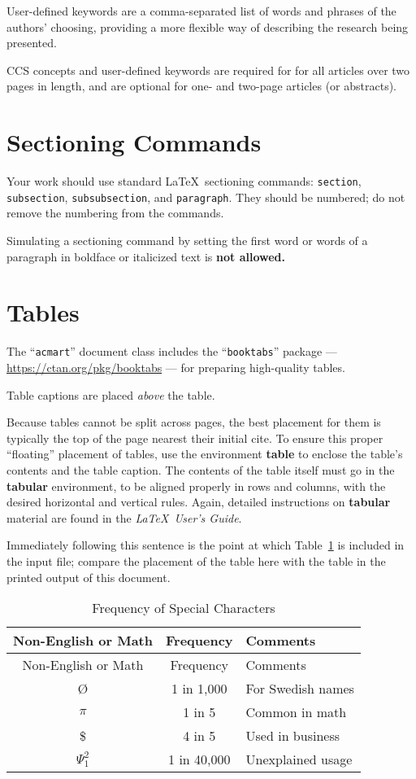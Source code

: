\documentclass[manuscript,screen]{acmart}
\begin{document}
User-defined keywords are a comma-separated list of words and phrases of
the authors' choosing, providing a more flexible way of describing the
research being presented.

CCS concepts and user-defined keywords are required for for all articles
over two pages in length, and are optional for one- and two-page
articles (or abstracts).

\section{Sectioning Commands}\label{sectioning-commands}

Your work should use standard \LaTeX~sectioning commands:
\texttt{section}, \texttt{subsection}, \texttt{subsubsection}, and
\texttt{paragraph}. They should be numbered; do not remove the numbering
from the commands.

Simulating a sectioning command by setting the first word or words of a
paragraph in boldface or italicized text is \textbf{not allowed.}

\section{Tables}\label{tables}

The ``\texttt{acmart}'' document class includes the
``\texttt{booktabs}'' package --- \url{https://ctan.org/pkg/booktabs}
--- for preparing high-quality tables.

Table captions are placed \emph{above} the table.

Because tables cannot be split across pages, the best placement for them
is typically the top of the page nearest their initial cite. To ensure
this proper ``floating'' placement of tables, use the environment
\textbf{table} to enclose the table's contents and the table caption.
The contents of the table itself must go in the \textbf{tabular}
environment, to be aligned properly in rows and columns, with the
desired horizontal and vertical rules. Again, detailed instructions on
\textbf{tabular} material are found in the \emph{\LaTeX~User's Guide}.

Immediately following this sentence is the point at which
Table~\ref{tbl-freq} is included in the input file; compare the
placement of the table here with the table in the printed output of this
document.

\begin{longtable}[]{@{}ccl@{}}
\caption{Frequency of Special Characters}\label{tbl-freq}\tabularnewline
\toprule\noalign{}
Non-English or Math & Frequency & Comments \\
\midrule\noalign{}
\endfirsthead
\toprule\noalign{}
Non-English or Math & Frequency & Comments \\
\midrule\noalign{}
\endhead
\bottomrule\noalign{}
\endlastfoot
Ø & 1 in 1,000 & For Swedish names \\
\(\pi\) & 1 in 5 & Common in math \\
\$ & 4 in 5 & Used in business \\
\(\Psi^2_1\) & 1 in 40,000 & Unexplained usage \\
\end{longtable}
\end{document}
